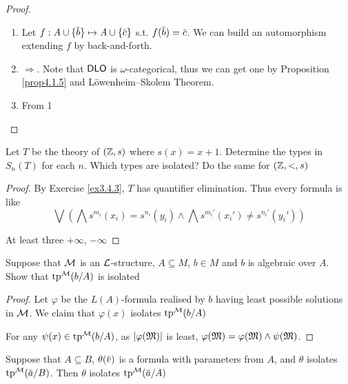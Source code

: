 \documentclass[11pt]{article}
\begin{document}
\begin{proof}
\begin{enumerate}
\item Let \(f:A\cup\{\barb\}\mapsto A\cup\{\barc\}\) s.t. \(f(\barb)=\barc\). We can build an automorphism
extending \(f\) by back-and-forth.
\item \(\Rightarrow\). Note that \(\operatorname{\textsf{DLO}}\) is \(\omega\)-categorical, thus we can get one by Proposition \ref{prop4.1.5}
and Löwenheim–Skolem Theorem.
\item From 1
\end{enumerate}
\end{proof}

\begin{exercise}
\label{ex4.5.2}
Let \(T\) be the theory of \((\mathbb{Z},s)\) where \(s(x)=x+1\). Determine the types in \(S_n(T)\) for
each \(n\). Which types are isolated? Do the same for \((\mathbb{Z},<,s)\)
\end{exercise}

\begin{proof}
By Exercise \ref{ex3.4.3}, \(T\) has quantifier elimination. Thus every formula is like
\begin{equation*}
\bigvee\left(\bigwedge s^{m_i}(x_i)=s^{n_i}(y_i)\wedge\bigwedge s^{m_i'}(x_i')\neq s^{n_i'}(y_i')\right)
\end{equation*}

At least three \(+\infty\), \(-\infty\)
\end{proof}

\begin{exercise}
\label{ex4.5.4}
Suppose that \(\mathcal{M}\) is an \(\mathcal{L}\)-structure, \(A\subseteq M\), \(b\in M\) and \(b\) is algebraic over \(A\).
Show that \(\operatorname{tp}^{\mathcal{M}}(b/A)\) is isolated
\end{exercise}

\begin{proof}
Let \(\varphi\) be the  \(L(A)\)-formula realised by \(b\) having least possible solutions in \(\mathcal{M}\). We
claim that \(\varphi(x)\) isolates \(\operatorname{tp}^{\mathcal{M}}(b/A)\)

For any \(\psi(x)\in\operatorname{tp}^{\mathcal{M}}(b/A)\),
as \(\abs{\varphi(\fM)}\) is least, \(\varphi(\mathfrak{M})=\varphi(\mathfrak{M})\wedge\psi(\mathfrak{M})\).
\end{proof}

\begin{exercise}
\label{ex4.5.10}
Suppose that \(A\subseteq B\), \(\theta(\barv)\) is a formula with parameters from \(A\), and \(\theta\)
isolates \(\tp^{\calm}(\bara/B)\). Then \(\theta\) isolates \(\tp^{\calm}(\bara/A)\)
\end{exercise}
\end{document}
